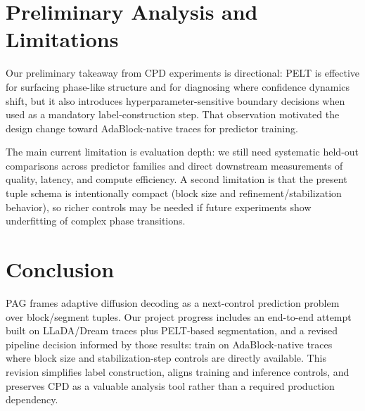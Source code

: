\documentclass[11pt]{article}
\begin{document}
\section{Preliminary Analysis and Limitations}

Our preliminary takeaway from CPD experiments is directional: PELT is effective for surfacing phase-like structure and for diagnosing where confidence dynamics shift, but it also introduces hyperparameter-sensitive boundary decisions when used as a mandatory label-construction step. That observation motivated the design change toward AdaBlock-native traces for predictor training.

The main current limitation is evaluation depth: we still need systematic held-out comparisons across predictor families and direct downstream measurements of quality, latency, and compute efficiency. A second limitation is that the present tuple schema is intentionally compact (block size and refinement/stabilization behavior), so richer controls may be needed if future experiments show underfitting of complex phase transitions.

\section{Conclusion}

PAG frames adaptive diffusion decoding as a next-control prediction problem over block/segment tuples. Our project progress includes an end-to-end attempt built on LLaDA/Dream traces plus PELT-based segmentation, and a revised pipeline decision informed by those results: train on AdaBlock-native traces where block size and stabilization-step controls are directly available. This revision simplifies label construction, aligns training and inference controls, and preserves CPD as a valuable analysis tool rather than a required production dependency.


\end{document}
